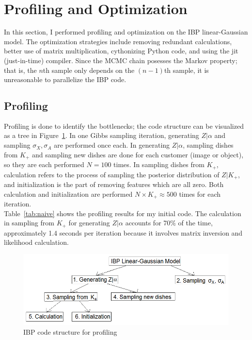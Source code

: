 \section{Profiling and Optimization}
In this section, I performed profiling and optimization on the IBP linear-Gaussian model. The optimization strategies include removing redundant calculations, better use of matrix multiplication, cythonizing Python code, and using the jit (just-in-time) compiler. Since the MCMC chain posesses the Markov property; that is, the $n$th sample only depends on the $(n-1)$th sample, it is unreasonable to parallelize the IBP code.

\subsection{Profiling}
Profiling is done to identify the bottlenecks; the code structure can be visualized as a tree in Figure~\ref{fig:profiling}. In one Gibbs sampling iteration, generating $Z|\alpha$ and sampling $\sigma_X,\sigma_A$ are performed once each. In generating $Z|\alpha$, sampling dishes from $K_+$ and sampling new dishes are done for each customer (image or object), so they are each performed $N=100$ times. In sampling dishes from $K_+$, calculation refers to the process of sampling the posterior distribution of $Z|K_+$, and initialization is the part of removing features which are all zero. Both calculation and initialization are performed $N\times K_+ \approx 500$ times for each iteration.\\

Table~\ref{tab:naive} shows the profiling results for my initial code. The calculation in sampling from $K_+$ for generating $Z|\alpha$ accounts for 70\% of the time, approximately 1.4 seconds per iteration because it involves matrix inversion and likelihood calculation.

\begin{figure}[!ht]
\centering
    \includegraphics[width=\linewidth]{IBP_profiling.png}
    \caption{IBP code structure for profiling}
    \label{fig:profiling}
\end{figure}

